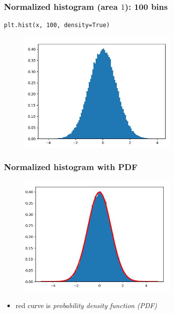 \documentclass[english,14pt]{beamer}
\newcommand\red[1]{{\color{red} #1}}
\begin{document}

\begin{frame}[fragile]

\frametitle{Normalized histogram (area $1$): 100 bins}

\begin{lstlisting}[style=CStyle,basicstyle=\scriptsize]
plt.hist(x, 100, density=True)
\end{lstlisting}

\begin{figure}[ht]
	\centering
	\includegraphics[width=0.7\textwidth]{figures/hist100BinsDensity}
\end{figure}

\end{frame}


\begin{frame}[fragile]

\frametitle{Normalized histogram with PDF}

\begin{figure}[ht]
	\centering
	\includegraphics[width=0.7\textwidth]{figures/histWithpdf}
\end{figure}

\begin{itemize}
	\item[] red curve is \red{\emph{probability density function (PDF)}}
\end{itemize}

\end{frame}
\end{document}
